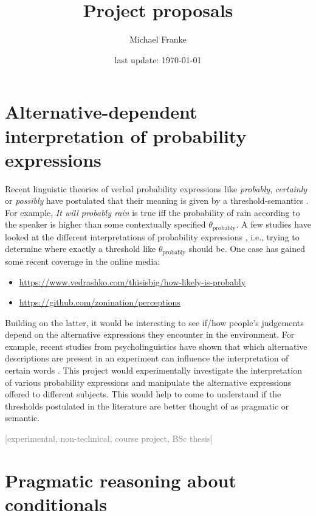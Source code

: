 \documentclass[fleqn,reqno,10pt]{article}
\title{Project proposals}
\author{Michael Franke}
\date{last update: \today}
\newcommand{\scope}[1]{\hfill\textcolor{gray}{[#1]}}
\begin{document}
\maketitle

\section{Alternative-dependent interpretation of probability expressions}

Recent linguistic theories of verbal probability expressions like \emph{probably}, \emph{certainly} or \emph{possibly} have postulated that their meaning is given by a threshold-semantics \citep[e.g.][]{Yalcin2010:Probability-Ope}. For example, \emph{It will probably rain} is true iff the probability of rain according to the speaker is higher than some contextually specified $\theta_{\text{probably}}$. A few studies have looked at the different interpretations of probability expressions \citep[e.g.][]{wind1996}, i.e., trying to determine where exactly a threshold like $\theta_{\text{probably}}$ should be. One case has gained some recent coverage in the online media:
%
\begin{itemize}
\item \url{https://www.vedrashko.com/thisisbig/how-likely-is-probably}
\item \url{https://github.com/zonination/perceptions}
\end{itemize}
%
Building on the latter, it would be interesting to see if/how people's judgements depend on the alternative expressions they encounter in the environment. For example, recent studies from psycholinguistics have shown that which alternative descriptions are present in an experiment can influence the interpretation of certain words \citep[e.g.][]{DegenTanenhaus2012:Processing-Scal,Franke2016:Task-types-link}. This project would experimentally investigate the interpretation of various probability expressions and manipulate the alternative expressions offered to different subjects. This would help to come to understand if the thresholds postulated in the literature are better thought of as pragmatic or semantic.

\scope{experimental, non-technical, course project, BSc thesis} 



\section{Pragmatic reasoning about conditionals }
\end{document}
